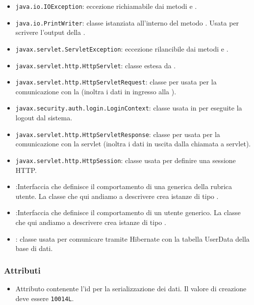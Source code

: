 \begin{itemize}
	\item \texttt{java.io.IOException}: eccezione richiamabile dai metodi  e .
	\item \texttt{java.io.PrintWriter}: classe istanziata all'interno del metodo . Usata per scrivere l'output della .
	\item \texttt{javax.servlet.ServletException}: eccezione rilancibile dai metodi  e .
	\item \texttt{javax.servlet.http.HttpServlet}: classe estesa da .
	\item \texttt{javax.servlet.http.HttpServletRequest}:  classe per usata per la comunicazione con la  (inoltra i dati in ingresso alla ).
	\item \texttt{javax.security.auth.login.LoginContext}: classe usata in  per eseguite la logout dal sistema.
	\item \texttt{javax.servlet.http.HttpServletResponse}: classe per usata per la comunicazione con la servlet (inoltra i dati in uscita dalla chiamata a servlet).
	\item \texttt{javax.servlet.http.HttpSession}: classe usata per definire una sessione HTTP.
	\item {}:Interfaccia che definisce il comportamento di una generica  della rubrica utente. La classe che qui andiamo a descrivere crea istanze di tipo .
	\item {}:Interfaccia che definisce il comportamento di un utente generico. La classe che qui andiamo a descrivere crea istanze di tipo .
	\item {}: classe usata per comunicare tramite Hibernate con la tabella UserData della base di dati.
\end{itemize}

\subsubsection*{Attributi}

\begin{itemize}
	\item{}
	Attributo contenente l'id per la serializzazione dei dati. Il valore di creazione deve essere \texttt{10014L}.
\end{itemize}

